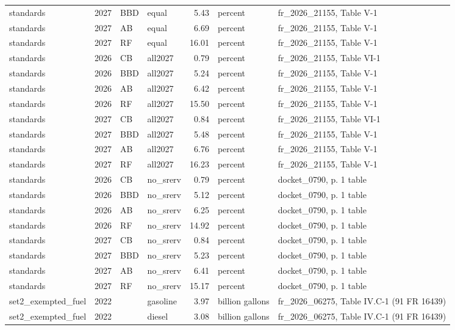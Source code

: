 \begin{longtable}{p{2.3cm}p{0.7cm}p{1.0cm}p{2.6cm}rp{1.7cm}p{4.6cm}}
standards & 2027 & BBD & equal & 5.43 & percent & fr\_2026\_21155, Table V-1 \\
standards & 2027 & AB & equal & 6.69 & percent & fr\_2026\_21155, Table V-1 \\
standards & 2027 & RF & equal & 16.01 & percent & fr\_2026\_21155, Table V-1 \\
standards & 2026 & CB & all2027 & 0.79 & percent & fr\_2026\_21155, Table VI-1 \\
standards & 2026 & BBD & all2027 & 5.24 & percent & fr\_2026\_21155, Table V-1 \\
standards & 2026 & AB & all2027 & 6.42 & percent & fr\_2026\_21155, Table V-1 \\
standards & 2026 & RF & all2027 & 15.50 & percent & fr\_2026\_21155, Table V-1 \\
standards & 2027 & CB & all2027 & 0.84 & percent & fr\_2026\_21155, Table VI-1 \\
standards & 2027 & BBD & all2027 & 5.48 & percent & fr\_2026\_21155, Table V-1 \\
standards & 2027 & AB & all2027 & 6.76 & percent & fr\_2026\_21155, Table V-1 \\
standards & 2027 & RF & all2027 & 16.23 & percent & fr\_2026\_21155, Table V-1 \\
standards & 2026 & CB & no\_srerv & 0.79 & percent & docket\_0790, p. 1 table \\
standards & 2026 & BBD & no\_srerv & 5.12 & percent & docket\_0790, p. 1 table \\
standards & 2026 & AB & no\_srerv & 6.25 & percent & docket\_0790, p. 1 table \\
standards & 2026 & RF & no\_srerv & 14.92 & percent & docket\_0790, p. 1 table \\
standards & 2027 & CB & no\_srerv & 0.84 & percent & docket\_0790, p. 1 table \\
standards & 2027 & BBD & no\_srerv & 5.23 & percent & docket\_0790, p. 1 table \\
standards & 2027 & AB & no\_srerv & 6.41 & percent & docket\_0790, p. 1 table \\
standards & 2027 & RF & no\_srerv & 15.17 & percent & docket\_0790, p. 1 table \\
set2\_exempted\_fuel & 2022 &  & gasoline & 3.97 & billion gallons & fr\_2026\_06275, Table IV.C-1 (91 FR 16439) \\
set2\_exempted\_fuel & 2022 &  & diesel & 3.08 & billion gallons & fr\_2026\_06275, Table IV.C-1 (91 FR 16439) \\

\end{longtable}
